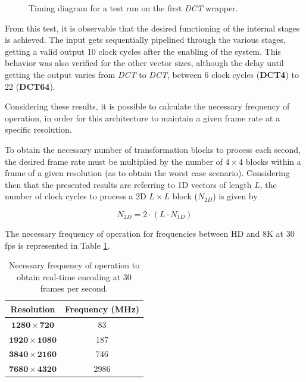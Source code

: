 \begin{figure}[!htbp]
    \centering
    
    \caption{Timing diagram for a test run on the first \emph{DCT} wrapper.}
    \label{fig:v1timing}
\end{figure}

From this test, it is observable that the desired functioning of the internal stages is achieved. The input gets sequentially pipelined through the various stages, getting a valid output 10 clock cycles after the enabling of the system. This behavior was also verified for the other vector sizes, although the delay until getting the output varies from \emph{DCT} to \emph{DCT}, between 6 clock cycles (\textbf{DCT4}) to 22 (\textbf{DCT64}).



Considering these results, it is possible to calculate the necessary frequency of operation, in order for this architecture to maintain a given frame rate at a specific resolution.

To obtain the necessary number of transformation blocks to process each second, the desired frame rate must be multiplied by the number of $4 \times 4$ blocks within a frame of a given resolution (as to obtain the worst case scenario). Considering then that the presented results are referring to 1D vectors of length $L$, the number of clock cycles to process a 2D $L\times L$ block ($N_{2D}$) is given by

\begin{equation}
    N_{2D} = 2\cdot (L\cdot N_{1D})
\end{equation}

The necessary frequency of operation for frequencies between HD and 8K at 30 fps is represented in Table \ref{tab:freq30}.

\begin{table}[!htpb]
    \centering
    \caption{Necessary frequency of operation to obtain real-time encoding at 30 frames per second.}
    \begin{tabular}{cc} \toprule
        \textbf{Resolution}         & \textbf{Frequency (MHz)} \\ \toprule
        $\mathbf{1280\times 720}$   & 83 \\
        $\mathbf{1920\times 1080}$  & 187 \\
        $\mathbf{3840\times 2160}$  & 746 \\
        $\mathbf{7680\times 4320}$  & 2986 \\
        \bottomrule
    \end{tabular}    
    \label{tab:freq30}
\end{table}

